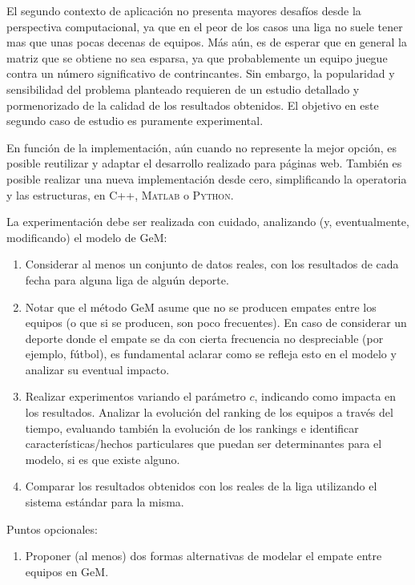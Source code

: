 \documentclass[11pt, a4paper]{article}
\begin{document}
El segundo contexto de aplicaci\'on no presenta mayores desaf\'ios desde la perspectiva computacional, ya que en el peor de los casos una liga no suele tener
mas que unas pocas decenas de equipos. M\'as a\'un, es de esperar que en general la matriz que se obtiene no sea esparsa, ya que probablemente un equipo juegue
contra un n\'umero significativo de contrincantes. Sin embargo, la popularidad y sensibilidad del problema planteado requieren de un estudio detallado y 
pormenorizado de la calidad de los resultados obtenidos. El objetivo en este segundo caso de estudio es puramente experimental. 

En funci\'on de la implementaci\'on, a\'un cuando no represente la mejor opci\'on, es posible reutilizar y adaptar el desarrollo realizado para p\'aginas web. 
Tambi\'en es posible realizar una nueva implementaci\'on desde cero, simplificando la operatoria y las estructuras, en \textsc{C++}, \textsc{Matlab} o 
\textsc{Python}.

La experimentaci\'on debe ser realizada con cuidado, analizando (y, eventualmente, modificando) el modelo de GeM:
\begin{enumerate}
\item Considerar al menos un conjunto de datos reales, con los resultados de cada fecha para alguna liga de algu\'un deporte.
\item Notar que el m\'etodo GeM asume que no se producen empates entre los equipos (o que si se producen, son poco frecuentes). En caso de considerar un 
deporte donde el empate se da con cierta frecuencia no despreciable (por ejemplo, f\'utbol), es fundamental aclarar como se refleja esto en el modelo y 
analizar su eventual impacto.
\item Realizar experimentos variando el par\'ametro $c$, indicando como impacta en los resultados. Analizar la evoluci\'on del ranking de los equipos a 
trav\'es del tiempo, evaluando tambi\'en la evoluci\'on de los rankings e identificar caracter\'isticas/hechos particulares que puedan ser determinantes 
para el modelo, si es que existe alguno.
\item Comparar los resultados obtenidos con los reales de la liga utilizando el sistema est\'andar para la misma.
\end{enumerate}

Puntos opcionales:
\begin{enumerate}
\item Proponer (al menos) dos formas alternativas de modelar el empate entre equipos en GeM.
\end{enumerate}
\end{document}
